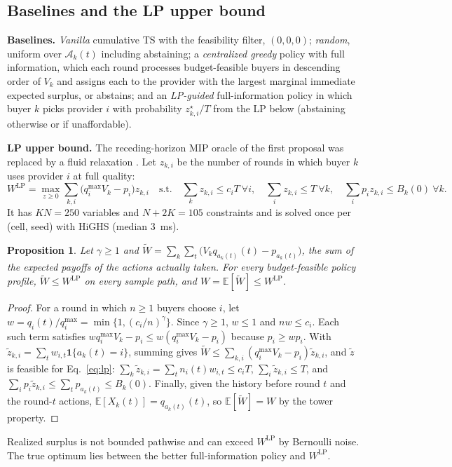 \documentclass{article}
\newtheorem{proposition}{Proposition}
\newcommand{\WLP}{W^{\mathrm{LP}}}
\begin{document}
\subsection{Baselines and the LP upper bound}
\textbf{Baselines.} \emph{Vanilla} cumulative TS with the feasibility filter, $(0,0,0)$; \emph{random}, uniform over $\mathcal A_k(t)$ including abstaining; a \emph{centralized greedy} policy with full information, which each round processes budget-feasible buyers in descending order of $V_k$ and assigns each to the provider with the largest marginal immediate expected surplus, or abstains; and an \emph{LP-guided} full-information policy in which buyer $k$ picks provider $i$ with probability $z^\star_{k,i}/T$ from the LP below (abstaining otherwise or if unaffordable).

\textbf{LP upper bound.} The receding-horizon MIP oracle of the first proposal was replaced by a fluid relaxation \cite{badanidiyuru2013}. Let $z_{k,i}$ be the number of rounds in which buyer $k$ uses provider $i$ at full quality:
\begin{equation}
\WLP=\max_{z\ge0}\sum_{k,i}\big(q_i^{\max}V_k-p_i\big)z_{k,i}\quad\text{s.t.}\quad\sum_kz_{k,i}\le c_iT\ \forall i,\quad\sum_iz_{k,i}\le T\ \forall k,\quad\sum_ip_iz_{k,i}\le B_k(0)\ \forall k.
\label{eq:lp}
\end{equation}
It has $KN=250$ variables and $N+2K=105$ constraints and is solved once per (cell, seed) with HiGHS (median 3~ms).

\begin{proposition}
\label{prop:lp}
Let $\gamma\ge1$ and $\widetilde W=\sum_k\sum_t\big(V_kq_{a_k(t)}(t)-p_{a_k(t)}\big)$, the sum of the expected payoffs of the actions actually taken. For every budget-feasible policy profile, $\widetilde W\le\WLP$ on every sample path, and $W=\mathbb E[\widetilde W]\le\WLP$.
\end{proposition}
\begin{proof}
For a round in which $n\ge1$ buyers choose $i$, let $w=q_i(t)/q_i^{\max}=\min\{1,(c_i/n)^\gamma\}$. Since $\gamma\ge1$, $w\le1$ and $nw\le c_i$. Each such term satisfies $wq_i^{\max}V_k-p_i\le w(q_i^{\max}V_k-p_i)$ because $p_i\ge wp_i$. With $\tilde z_{k,i}=\sum_tw_{i,t}\mathbf 1\{a_k(t)=i\}$, summing gives $\widetilde W\le\sum_{k,i}(q_i^{\max}V_k-p_i)\tilde z_{k,i}$, and $\tilde z$ is feasible for Eq.~\eqref{eq:lp}: $\sum_k\tilde z_{k,i}=\sum_tn_i(t)w_{i,t}\le c_iT$, $\sum_i\tilde z_{k,i}\le T$, and $\sum_ip_i\tilde z_{k,i}\le\sum_tp_{a_k(t)}\le B_k(0)$. Finally, given the history before round $t$ and the round-$t$ actions, $\mathbb E[X_k(t)]=q_{a_k(t)}(t)$, so $\mathbb E[\widetilde W]=W$ by the tower property.
\end{proof}
Realized surplus is not bounded pathwise and can exceed $\WLP$ by Bernoulli noise. The true optimum lies between the better full-information policy and $\WLP$.
\end{document}
